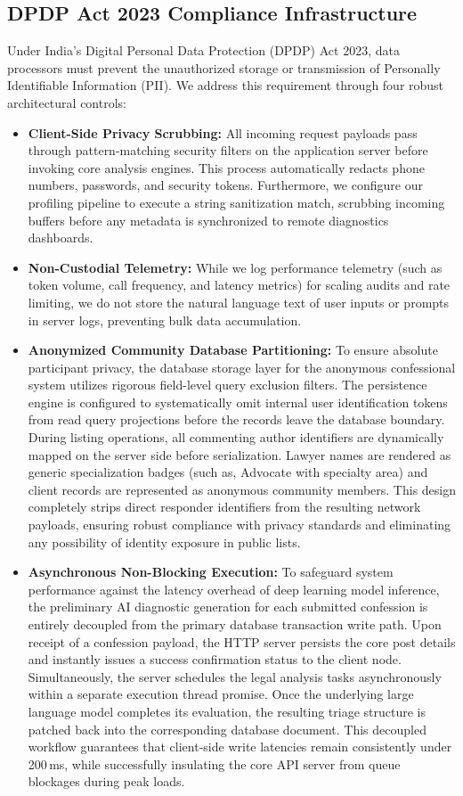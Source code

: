 \documentclass[conference]{IEEEtran}
\begin{document}
\subsection{DPDP Act 2023 Compliance Infrastructure}
Under India's Digital Personal Data Protection (DPDP) Act 2023, data processors must prevent the unauthorized storage or transmission of Personally Identifiable Information (PII). We address this requirement through four robust architectural controls:
\begin{itemize}[leftmargin=*]
  \item \textbf{Client-Side Privacy Scrubbing:} All incoming request payloads pass through pattern-matching security filters on the application server before invoking core analysis engines. This process automatically redacts phone numbers, passwords, and security tokens. Furthermore, we configure our profiling pipeline to execute a string sanitization match, scrubbing incoming buffers before any metadata is synchronized to remote diagnostics dashboards.
  \item \textbf{Non-Custodial Telemetry:} While we log performance telemetry (such as token volume, call frequency, and latency metrics) for scaling audits and rate limiting, we do not store the natural language text of user inputs or prompts in server logs, preventing bulk data accumulation.
  \item \textbf{Anonymized Community Database Partitioning:} To ensure absolute participant privacy, the database storage layer for the anonymous confessional system utilizes rigorous field-level query exclusion filters. The persistence engine is configured to systematically omit internal user identification tokens from read query projections before the records leave the database boundary. During listing operations, all commenting author identifiers are dynamically mapped on the server side before serialization. Lawyer names are rendered as generic specialization badges (such as, Advocate with specialty area) and client records are represented as anonymous community members. This design completely strips direct responder identifiers from the resulting network payloads, ensuring robust compliance with privacy standards and eliminating any possibility of identity exposure in public lists.
  \item \textbf{Asynchronous Non-Blocking Execution:} To safeguard system performance against the latency overhead of deep learning model inference, the preliminary AI diagnostic generation for each submitted confession is entirely decoupled from the primary database transaction write path. Upon receipt of a confession payload, the HTTP server persists the core post details and instantly issues a success confirmation status to the client node. Simultaneously, the server schedules the legal analysis tasks asynchronously within a separate execution thread promise. Once the underlying large language model completes its evaluation, the resulting triage structure is patched back into the corresponding database document. This decoupled workflow guarantees that client-side write latencies remain consistently under 200\,ms, while successfully insulating the core API server from queue blockages during peak loads.

\end{itemize}
\end{document}
